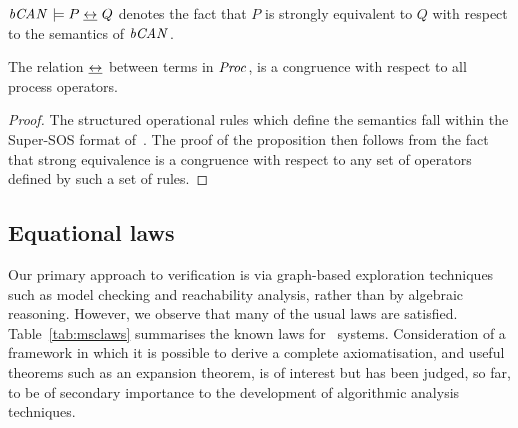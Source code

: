 \begin{notation}
${\text{\it bCAN\/}_{}} \models P \mathrel{\underline{\leftrightarrow}^{}_{}} Q$ denotes the fact that $P$ is
strongly equivalent to $Q$ with respect to the semantics of ${\text{\it bCAN\/}_{}}$.
\end{notation}

\begin{proposition}[Congruence]\label{prop:bccongruence} 
The relation $\mathrel{\underline{\leftrightarrow}^{}_{}}$ between terms in $\text{\it Proc\/}_{}$, is a congruence
with respect to all process operators.
\end{proposition}
\begin{proof}
The structured operational rules which define the semantics fall
within the Super-SOS format of~\cite{bv:94}.  The proof of the
proposition then follows from the fact that strong equivalence is a
congruence with respect to any set of operators defined by such a set
of rules.
\end{proof}

\subsection{Equational laws}\label{ss:bcequality}
Our primary approach to verification is via graph-based exploration
techniques such as model checking and reachability analysis, rather
than by algebraic reasoning.  However, we observe that many of the
usual laws are satisfied. Table~\ref{tab:msclaws} summarises the
known laws for \bcandle\ systems. Consideration of a framework in
which it is possible to derive a complete axiomatisation, and useful
theorems such as an expansion theorem, is of 
interest but has been judged, so far, to be of secondary importance
to the development of algorithmic analysis techniques.
   
